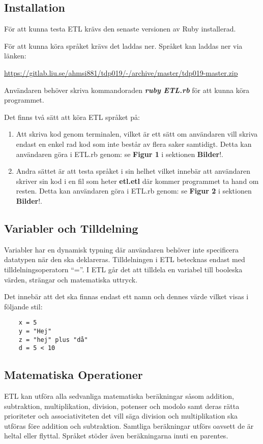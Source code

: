 \documentclass{TDP019mall}
\begin{document}
\subsection{Installation}
För att kunna testa ETL krävs den senaste versionen av Ruby installerad.

För att kunna köra språket krävs det laddas ner. Språket kan laddas ner via länken: 

\url{https://gitlab.liu.se/ahmsi881/tdp019/-/archive/master/tdp019-master.zip}

Användaren behöver skriva kommandoraden \textbf{\textit{ruby ETL.rb}} för att kunna köra programmet.

Det finns två sätt att köra ETL språket på:
\begin{enumerate}
    \item Att skriva kod genom terminalen, vilket är ett sätt om användaren vill skriva endast en enkel rad kod som inte består av flera saker samtidigt.
    Detta kan användaren göra i ETL.rb genom: se \textbf{Figur 1} i sektionen \textbf{Bilder}!.
    \item Andra sättet är att testa språket i sin helhet vilket innebär att användaren skriver sin kod i en fil som heter \textbf{etl.etl} där kommer 
    programmet ta hand om resten. Detta kan användaren göra i ETL.rb genom: se \textbf{Figur 2} i sektionen \textbf{Bilder}!.     
\end{enumerate}  

\newpage
\subsection{Variabler och Tilldelning}
Variabler har en dynamisk typning där användaren behöver inte specificera datatypen när den ska deklareras. Tilldelningen i ETL betecknas endast med 
tilldelningsoperatorn “=”. I ETL går det att tilldela en variabel till booleska värden, strängar och matematiska uttryck.

Det innebär att det ska finnas endast ett namn och dennes värde vilket visas i följande stil:
\begin{verbatim}
    x = 5 
    y = "Hej"
    z = "hej" plus "då"
    d = 5 < 10
\end{verbatim}


\subsection{Matematiska Operationer}
ETL kan utföra alla sedvanliga matematiska beräkningar såsom addition, subtraktion, multiplikation, division, potenser och modolo 
samt deras rätta prioriteter och associativiteten det vill säga division och multiplikation ska utföras före addition och subtraktion. 
Samtliga beräkningar utförs oavsett de är heltal eller flyttal. Språket stöder även beräkningarna inuti en parentes. 
\end{document}
